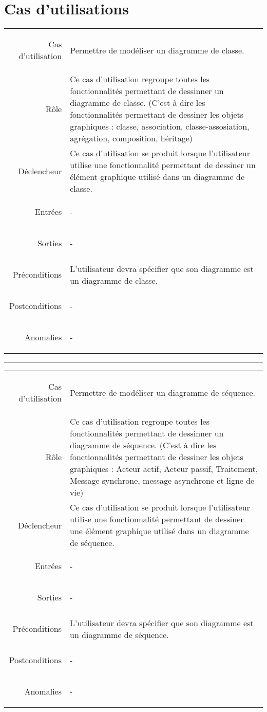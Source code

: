 \documentclass[12pt,a4paper,openany]{report}
\begin{document}
	\section{Cas d'utilisations}

	\begin{longtable}{>{\begin{bf}} r <{\end{bf}}!{:}p{13.5cm}}
	Cas d'utilisation & Permettre de modéliser un diagramme de classe.\\
	Rôle & Ce cas d'utilisation regroupe toutes les fonctionnalités permettant de dessinner un diagramme de classe.
	(C'est à dire les fonctionnalités permettant de dessiner les objets graphiques : classe, association, classe-assosiation,
	agrégation, composition, héritage) \\
	Déclencheur & Ce cas d'utilisation se produit lorsque l'utilisateur utilise une fonctionnalité permettant de dessiner un
	élément graphique utilisé dans un diagramme de classe.\\
	Entrées & -\\
	Sorties & -\\
	Préconditions & L'utilisateur devra spécifier que son diagramme est un diagramme de classe.\\
	Postconditions & -\\
	Anomalies & -\\
	\end{longtable}
	\begin{center}
	\rule{12.6cm}{.5pt}
	\end{center}
	\begin{longtable}{>{\begin{bf}} r <{\end{bf}}!{:}p{13.5cm}}
	Cas d'utilisation & Permettre de modéliser un diagramme de séquence.\\
	Rôle & Ce cas d'utilisation regroupe toutes les fonctionnalités permettant de dessinner un diagramme de séquence.
	(C'est à dire les fonctionnalités permettant de dessiner les objets graphiques : Acteur actif, Acteur passif, Traitement,
	Message synchrone, message asynchrone et ligne de vie)\\
	Déclencheur & Ce cas d'utilisation se produit lorsque l'utilisateur utilise une fonctionnalité permettant de dessiner une élément
	graphique utilisé dans un diagramme de séquence.\\
	Entrées & -\\
	Sorties & -\\
	Préconditions & L'utilisateur devra spécifier que son diagramme est un diagramme de séquence. \\
	Postconditions & -\\
	Anomalies & -\\
	\end{longtable}
\end{document}
